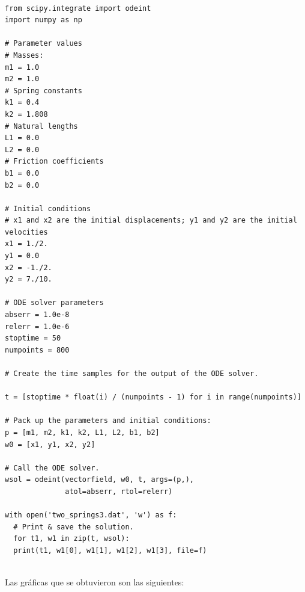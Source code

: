\documentclass[a4paper]{article}
\begin{document}
\begin{verbatim}

from scipy.integrate import odeint
import numpy as np

# Parameter values
# Masses:
m1 = 1.0
m2 = 1.0
# Spring constants
k1 = 0.4
k2 = 1.808
# Natural lengths
L1 = 0.0
L2 = 0.0
# Friction coefficients
b1 = 0.0
b2 = 0.0

# Initial conditions
# x1 and x2 are the initial displacements; y1 and y2 are the initial velocities
x1 = 1./2.
y1 = 0.0
x2 = -1./2.
y2 = 7./10.

# ODE solver parameters
abserr = 1.0e-8
relerr = 1.0e-6
stoptime = 50
numpoints = 800

# Create the time samples for the output of the ODE solver.

t = [stoptime * float(i) / (numpoints - 1) for i in range(numpoints)]

# Pack up the parameters and initial conditions:
p = [m1, m2, k1, k2, L1, L2, b1, b2]
w0 = [x1, y1, x2, y2]

# Call the ODE solver.
wsol = odeint(vectorfield, w0, t, args=(p,),
              atol=abserr, rtol=relerr)

with open('two_springs3.dat', 'w') as f:
  # Print & save the solution.
  for t1, w1 in zip(t, wsol):
  print(t1, w1[0], w1[1], w1[2], w1[3], file=f)
 
\end{verbatim}


Las gráficas que se obtuvieron son las siguientes:
\end{document}

